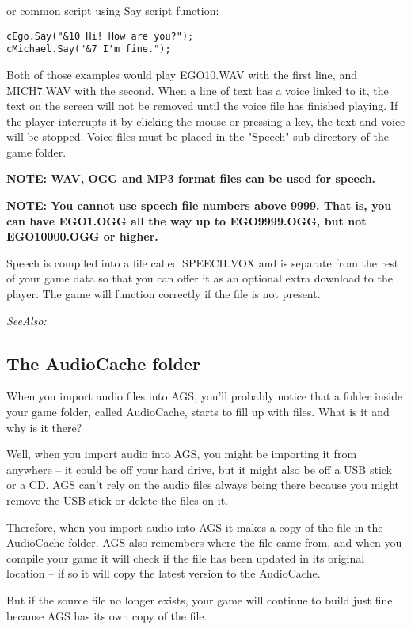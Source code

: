 or common script using Say script function:
\begin{verbatim}
cEgo.Say("&10 Hi! How are you?");
cMichael.Say("&7 I'm fine.");
\end{verbatim}

Both of those examples would play EGO10.WAV with the first line, and MICH7.WAV with the second.
When a line of text has a voice linked to it, the text on the screen will not
be removed until the voice file has finished playing. If the player interrupts
it by clicking the mouse or pressing a key, the text and voice will be stopped.
Voice files must be placed in the "Speech" sub-directory of the game folder.

\bf{NOTE:} WAV, OGG and MP3 format files can be used for speech.

\bf{NOTE:} You cannot use speech file numbers above 9999. That is, you can
have EGO1.OGG all the way up to EGO9999.OGG, but not EGO10000.OGG or higher.

Speech is compiled into a file called SPEECH.VOX and is separate
from the rest of your game data so that you can offer it as an optional extra
download to the player. The game will function correctly if the file is not
present.

\it{SeeAlso:} 


\subsection{The AudioCache folder}\label{AudioCache}%

When you import audio files into AGS, you'll probably notice that a folder
inside your game folder, called AudioCache, starts to fill up with files. What
is it and why is it there?

Well, when you import audio into AGS, you might be importing it from anywhere --
it could be off your hard drive, but it might also be off a USB stick or a CD.
AGS can't rely on the audio files always being there because you might remove
the USB stick or delete the files on it.

Therefore, when you import audio into AGS it makes a copy of the file in the AudioCache
folder. AGS also remembers where the file came from, and when you compile your game
it will check if the file has been updated in its original location -- if so it will
copy the latest version to the AudioCache.

But if the source file no longer exists, your game will continue to build just fine
because AGS has its own copy of the file.

